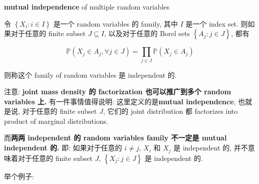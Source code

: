 \documentclass{qlnotes-export}
\begin{document}
\begin{definition}{\textbf{mutual independence} of multiple random variables}\label{def-03-joint-conditional-distribution-mutual-independence-of-multiple-random-variables}

令 \(\left\{ {X_{i}:i \in I} \right\}\) 是一个 random variables 的 family, 其中 \(I\) 是一个 index set. 则如果对于任意的 finite subset \(J \subseteq I\), 以及对于任意的 Borel sets \(\left\{ {A_{j}:j \in J} \right\}\), 都有

\[{\mathbb{P}}(X_{j} \in A_{j},\forall j \in J) = \prod\limits_{j \in J}{\mathbb{P}}(X_{j} \in A_{j})\]

则称这个 family of random variables 是 independent 的.

\end{definition}

注意: \textbf{joint mass{ } density 的 factorization 也可以推广到多个 random variables 上.} 有一件事情值得说明: 这里定义的是\textbf{mutual independence}, 也就是说, 对于任意的 finite subset \(J\), 它们的 joint distribution 都 factorizes into product of marginal distributions.

而\textbf{两两 independent 的 random variables family 不一定是 mutual independent 的.} 即: 如果对于任意的 \(i \neq j\), \(X_{i}\) 和 \(X_{j}\) 是 independent 的, 并不意味着对于任意的 finite subset \(J\), \(\left\{ {X_{j}:j \in J} \right\}\) 是 independent 的.

举个例子:
\end{document}
